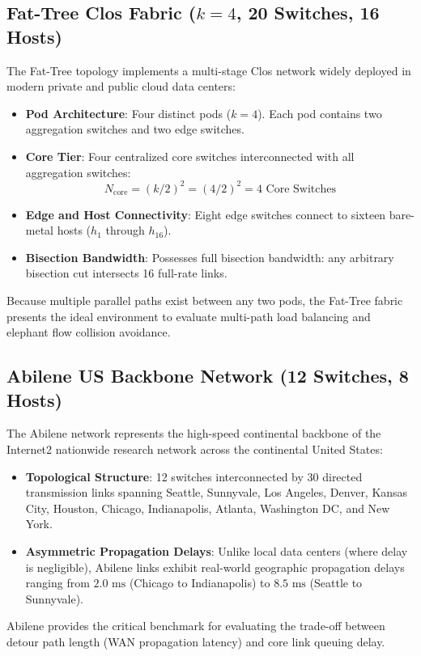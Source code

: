 \documentclass[12pt,a4paper,oneside]{report}
\begin{document}
\subsection{Fat-Tree Clos Fabric ($k=4$, 20 Switches, 16 Hosts)}
The Fat-Tree topology \cite{al2008scalable} implements a multi-stage Clos network widely deployed in modern private and public cloud data centers:
\begin{itemize}
    \item \textbf{Pod Architecture}: Four distinct pods ($k=4$). Each pod contains two aggregation switches and two edge switches.
    \item \textbf{Core Tier}: Four centralized core switches interconnected with all aggregation switches:
    \begin{equation}
        N_{\text{core}} = (k/2)^2 = (4/2)^2 = 4 \text{ Core Switches}
    \end{equation}
    \item \textbf{Edge and Host Connectivity}: Eight edge switches connect to sixteen bare-metal hosts ($h_1$ through $h_{16}$).
    \item \textbf{Bisection Bandwidth}: Possesses full bisection bandwidth: any arbitrary bisection cut intersects 16 full-rate links.
\end{itemize}
Because multiple parallel paths exist between any two pods, the Fat-Tree fabric presents the ideal environment to evaluate multi-path load balancing and elephant flow collision avoidance.

\subsection{Abilene US Backbone Network (12 Switches, 8 Hosts)}
The Abilene network represents the high-speed continental backbone of the Internet2 nationwide research network across the continental United States:
\begin{itemize}
    \item \textbf{Topological Structure}: 12 switches interconnected by 30 directed transmission links spanning Seattle, Sunnyvale, Los Angeles, Denver, Kansas City, Houston, Chicago, Indianapolis, Atlanta, Washington DC, and New York.
    \item \textbf{Asymmetric Propagation Delays}: Unlike local data centers (where delay is negligible), Abilene links exhibit real-world geographic propagation delays ranging from $2.0\text{ ms}$ (Chicago to Indianapolis) to $8.5\text{ ms}$ (Seattle to Sunnyvale).
\end{itemize}
Abilene provides the critical benchmark for evaluating the trade-off between detour path length (WAN propagation latency) and core link queuing delay.
\end{document}

